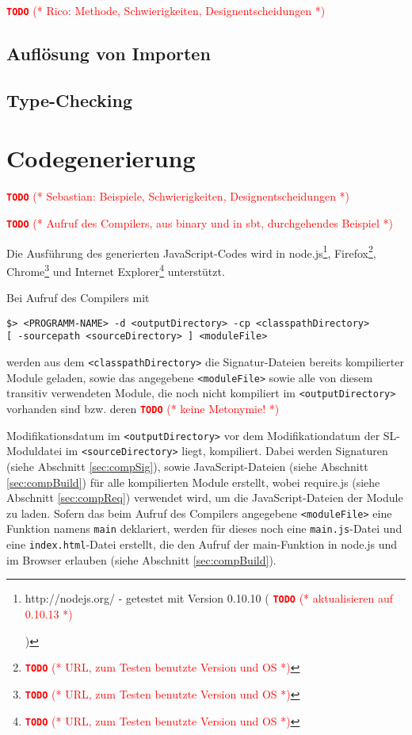 \documentclass{llncs}
\newcommand{\TODO}[1]{ \textcolor{red}{\textbf{\texttt{\large{TODO}}} (* #1 *)}\par}
\begin{document}
\TODO{Rico: Methode, Schwierigkeiten, Designentscheidungen}

\subsection{Auflösung von Importen}

\subsection{Type-Checking}

\section{Codegenerierung}

\TODO{Sebastian: Beispiele, Schwierigkeiten, Designentscheidungen}

\TODO{Aufruf des Compilers, aus binary und in sbt, durchgehendes Beispiel}

Die Ausführung des generierten JavaScript-Codes wird in
node.js\footnote{http://nodejs.org/ - getestet mit Version 0.10.10
(\TODO{aktualisieren auf 0.10.13})},
Firefox\footnote{\TODO{URL, zum Testen benutzte Version und OS}},
Chrome\footnote{\TODO{URL, zum Testen benutzte Version und OS}} und
Internet Explorer\footnote{\TODO{URL, zum Testen benutzte Version und OS}}
unterstützt.

Bei Aufruf des Compilers mit
\begin{lstlisting}
$> <PROGRAMM-NAME> -d <outputDirectory> -cp <classpathDirectory>
[ -sourcepath <sourceDirectory> ] <moduleFile>
\end{lstlisting}

werden aus dem \texttt{<classpathDirectory>} die Signatur-Dateien
bereits kompilierter Module geladen, sowie das angegebene
\texttt{<moduleFile>} sowie alle von diesem transitiv verwendeten Module,
die noch nicht kompiliert im \texttt{<outputDirectory>} vorhanden sind
bzw. deren \TODO{keine Metonymie!} Modifikationsdatum im
\texttt{<outputDirectory>} vor dem Modifikationdatum der
SL-Moduldatei im \texttt{<sourceDirectory>} liegt, kompiliert. Dabei
werden Signaturen (siehe Abschnitt \ref{sec:compSig}), sowie
JavaScript-Dateien (siehe Abschnitt \ref{sec:compBuild}) für alle
kompilierten Module erstellt, wobei require.js (siehe Abschnitt
\ref{sec:compReq}) verwendet wird, um die JavaScript-Dateien der
Module zu laden. Sofern das beim Aufruf des Compilers angegebene
\texttt{<moduleFile>} eine Funktion namens
\texttt{main} deklariert, werden für dieses noch eine
\texttt{main.js}-Datei und eine \texttt{index.html}-Datei erstellt,
die den Aufruf der main-Funktion in node.js und im Browser erlauben
(siehe Abschnitt \ref{sec:compBuild}).
\end{document}
